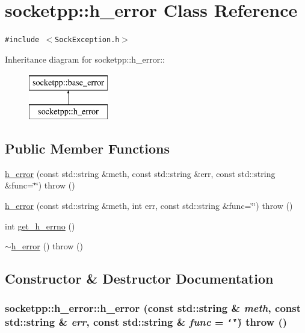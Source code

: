 \hypertarget{classsocketpp_1_1h__error}{
\section{socketpp::h\_\-error Class Reference}
\label{classsocketpp_1_1h__error}
}
{\tt \#include $<$SockException.h$>$}

Inheritance diagram for socketpp::h\_\-error::\begin{figure}[H]
\begin{center}
\leavevmode
\includegraphics[height=2cm]{classsocketpp_1_1h__error}
\end{center}
\end{figure}
\subsection*{Public Member Functions}
\begin{CompactItemize}
\item 
\hyperlink{classsocketpp_1_1h__error_c15a1c6216114250241349fdfcdeb98a}{h\_\-error} (const std::string \&meth, const std::string \&err, const std::string \&func=\char`\"{}\char`\"{})  throw ()
\item 
\hyperlink{classsocketpp_1_1h__error_67e7b6bcd23ebdd79a5fdcf1f01070fe}{h\_\-error} (const std::string \&meth, int err, const std::string \&func=\char`\"{}\char`\"{})  throw ()
\item 
int \hyperlink{classsocketpp_1_1h__error_b2aabd50ea2f3189b09bc749a875e38f}{get\_\-h\_\-errno} ()
\item 
\hyperlink{classsocketpp_1_1h__error_56261f751b9080d0a67f282e7ab2974b}{$\sim$h\_\-error} ()  throw ()
\end{CompactItemize}


\subsection{Constructor \& Destructor Documentation}
\hypertarget{classsocketpp_1_1h__error_c15a1c6216114250241349fdfcdeb98a}{
\subsubsection[{h\_\-error}]{\setlength{\rightskip}{0pt plus 5cm}socketpp::h\_\-error::h\_\-error (const std::string \& {\em meth}, \/  const std::string \& {\em err}, \/  const std::string \& {\em func} = {\tt \char`\"{}\char`\"{}})  throw ()}}
\label{classsocketpp_1_1h__error_c15a1c6216114250241349fdfcdeb98a}


